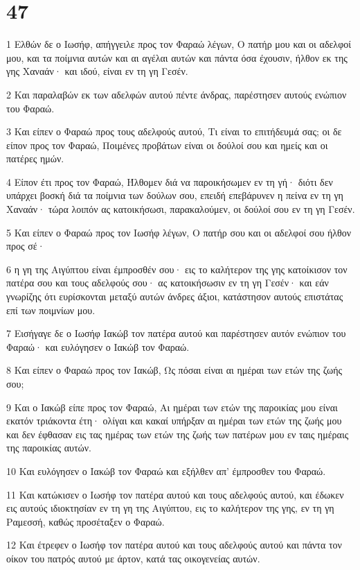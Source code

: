 \chapter{47}

\par 1 Ελθών δε ο Ιωσήφ, απήγγειλε προς τον Φαραώ λέγων, Ο πατήρ μου και οι αδελφοί μου, και τα ποίμνια αυτών και αι αγέλαι αυτών και πάντα όσα έχουσιν, ήλθον εκ της γης Χαναάν· και ιδού, είναι εν τη γη Γεσέν.
\par 2 Και παραλαβών εκ των αδελφών αυτού πέντε άνδρας, παρέστησεν αυτούς ενώπιον του Φαραώ.
\par 3 Και είπεν ο Φαραώ προς τους αδελφούς αυτού, Τι είναι το επιτήδευμά σας; οι δε είπον προς τον Φαραώ, Ποιμένες προβάτων είναι οι δούλοί σου και ημείς και οι πατέρες ημών.
\par 4 Είπον έτι προς τον Φαραώ, Ήλθομεν διά να παροικήσωμεν εν τη γή· διότι δεν υπάρχει βοσκή διά τα ποίμνια των δούλων σου, επειδή επεβάρυνεν η πείνα εν τη γη Χαναάν· τώρα λοιπόν ας κατοικήσωσι, παρακαλούμεν, οι δούλοί σου εν τη γη Γεσέν.
\par 5 Και είπεν ο Φαραώ προς τον Ιωσήφ λέγων, Ο πατήρ σου και οι αδελφοί σου ήλθον προς σέ·
\par 6 η γη της Αιγύπτου είναι έμπροσθέν σου· εις το καλήτερον της γης κατοίκισον τον πατέρα σου και τους αδελφούς σου· ας κατοικήσωσιν εν τη γη Γεσέν· και εάν γνωρίζης ότι ευρίσκονται μεταξύ αυτών άνδρες άξιοι, κατάστησον αυτούς επιστάτας επί των ποιμνίων μου.
\par 7 Εισήγαγε δε ο Ιωσήφ Ιακώβ τον πατέρα αυτού και παρέστησεν αυτόν ενώπιον του Φαραώ· και ευλόγησεν ο Ιακώβ τον Φαραώ.
\par 8 Και είπεν ο Φαραώ προς τον Ιακώβ, Ως πόσαι είναι αι ημέραι των ετών της ζωής σου;
\par 9 Και ο Ιακώβ είπε προς τον Φαραώ, Αι ημέραι των ετών της παροικίας μου είναι εκατόν τριάκοντα έτη· ολίγαι και κακαί υπήρξαν αι ημέραι των ετών της ζωής μου και δεν έφθασαν εις τας ημέρας των ετών της ζωής των πατέρων μου εν ταις ημέραις της παροικίας αυτών.
\par 10 Και ευλόγησεν ο Ιακώβ τον Φαραώ και εξήλθεν απ' έμπροσθεν του Φαραώ.
\par 11 Και κατώκισεν ο Ιωσήφ τον πατέρα αυτού και τους αδελφούς αυτού, και έδωκεν εις αυτούς ιδιοκτησίαν εν τη γη της Αιγύπτου, εις το καλήτερον της γης, εν τη γη Ραμεσσή, καθώς προσέταξεν ο Φαραώ.
\par 12 Και έτρεφεν ο Ιωσήφ τον πατέρα αυτού και τους αδελφούς αυτού και πάντα τον οίκον του πατρός αυτού με άρτον, κατά τας οικογενείας αυτών.

